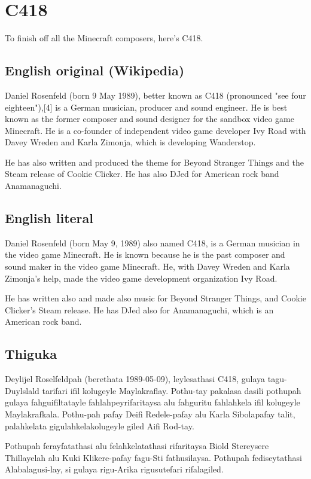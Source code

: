 

\section{C418}
To finish off all the Minecraft composers, here's C418.

\subsection*{English original (Wikipedia)}
Daniel Rosenfeld (born 9 May 1989), better known as C418 (pronounced "see four eighteen"),[4] is a German musician, producer and sound engineer.
He is best known as the former composer and sound designer for the sandbox video game Minecraft.
He is a co-founder of independent video game developer Ivy Road with Davey Wreden and Karla Zimonja, which is developing Wanderstop. 

He has also written and produced the theme for Beyond Stranger Things and the Steam release of Cookie Clicker.
He has also DJed for American rock band Anamanaguchi. 

\subsection*{English literal}
Daniel Rosenfeld (born May 9, 1989) also named C418, is a German musician in the video game Minecraft.
He is known because he is the past composer and sound maker in the video game Minecraft.
He, with Davey Wreden and Karla Zimonja's help, made the video game development organization Ivy Road.

He has written also and made also music for Beyond Stranger Things, and Cookie Clicker's Steam release.
He has DJed also for Anamanaguchi, which is an American rock band.

\subsection*{Thiguka}
Deylijel Roselfeldpah (berethata 1989-05-09), leylesathasi C418, gulaya tagu-Duylslald tarifari ifil kolugeyle Maylakraflay.
Pothu-tay pakalasa dasili pothupah gulaya fahguifiltatayle fahlahpeyrifaritaysa alu fahguritu fahlahkela ifil kolugeyle Maylakrafkala.
Pothu-pah pafay Deifi Redele-pafay alu Karla Sibolapafay talit, palahkelata gigulahkelakolugeyle giled Aifi Rod-tay.

Pothupah ferayfatathasi alu felahkelatathasi rifaritaysa Biold Stereysere Thillayelah alu Kuki Klikere-pafay fagu-Sti fathusilaysa.
Pothupah fediseytathasi Alabalagusi-lay, si gulaya rigu-Arika rigusutefari rifalagiled.


